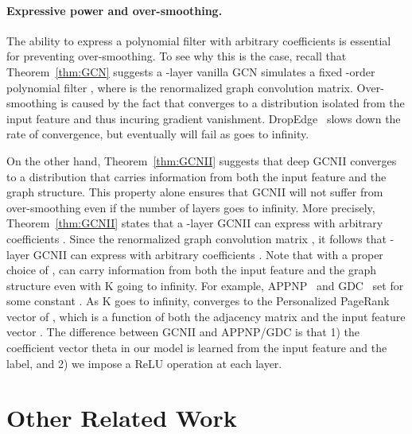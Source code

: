 \documentclass{article}
\begin{document}
\paragraph{Expressive power and over-smoothing.}
The ability to express a polynomial filter with
arbitrary coefficients is essential for preventing over-smoothing. To see why this is the case, recall that Theorem~\ref{thm:GCN} suggests a -layer vanilla GCN simulates a fixed -order polynomial filter , where  is the renormalized graph convolution matrix. Over-smoothing is caused by the fact that  converges to a distribution isolated from the input feature  and thus incuring gradient vanishment. DropEdge~\cite{rong2020dropedge} slows down the rate of convergence, but eventually will fail as  goes to infinity. 

On the other hand, Theorem~\ref{thm:GCNII} suggests that deep GCNII converges to a distribution that carries information from both the input feature and the graph structure. This property alone ensures that GCNII will not suffer from over-smoothing even if the number of layers goes to infinity. More precisely, 
Theorem~\ref{thm:GCNII} states that a -layer GCNII can express  with arbitrary coefficients . Since the renormalized graph convolution matrix , it follows that -layer GCNII can express  with arbitrary coefficients .  Note that with a proper choice of ,  can carry information from both the input feature and the graph structure even with K going to infinity. For example, APPNP~\cite{klicpera_predict_2019} and GDC~\cite{DBLP:conf/nips/KlicperaWG19} set  for some constant . As K goes to infinity,  converges to the Personalized PageRank vector of , which is a function of both the adjacency matrix  and the input feature vector . The difference between GCNII and APPNP/GDC is that 1) the coefficient vector theta in our model is learned from the input feature and the label, and 2) we impose a ReLU operation at each layer. 
 \section{Other Related Work}
\label{sec:related}
\end{document}
